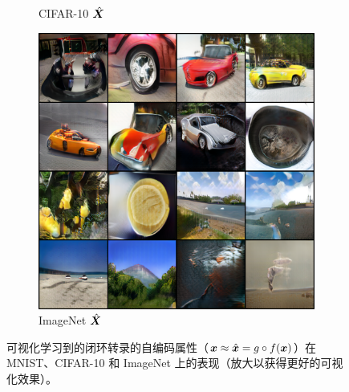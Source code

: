 \documentclass[../../book-main.tex]{subfiles}
\begin{document}
\begin{figure}[t]
\begin{subfigure}[t]{0.3\textwidth}
        \caption{{\small CIFAR-10 $\hat{\bm{X}}$}}
    \end{subfigure}
    \hfill
    \begin{subfigure}[t]{0.3\textwidth}
        \centering
        \includegraphics[width=\textwidth]{figs_chap6/Imagenet_reconstruct.png}
        \caption{{\small ImageNet $\hat{\bm{X}}$}}
    \end{subfigure}
    \caption{可视化学习到的闭环转录的自编码属性（$\bm{x} \approx \hat{\bm{x}} = g\circ f(\bm{x})$）在 MNIST、CIFAR-10 和 ImageNet 上的表现（放大以获得更好的可视化效果）。}
    \label{fig:justifyx=x}
\end{figure}
     
\end{document}
